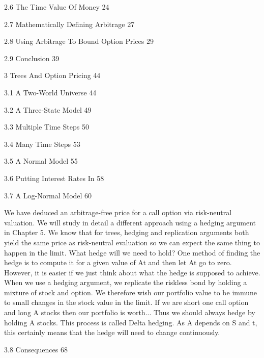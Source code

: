 2.6 The Time Value Of Money 24



2.7 Mathematically Defining Arbitrage 27



2.8 Using Arbitrage To Bound Option Prices 29



2.9 Conclusion 39



3 Trees And Option Pricing 44



3.1 A Two-World Universe 44



3.2 A Three-State Model 49



3.3 Multiple Time Steps 50



3.4 Many Time Steps 53



3.5 A Normal Model 55



3.6 Putting Interest Rates In 58



3.7 A Log-Normal Model 60

We have deduced an arbitrage-free price for a call option via risk-neutral valuation. We will study in detail a different approach using a hedging argument in Chapter 5. We know that for trees, hedging and replication arguments both yield the same price as risk-neutral evaluation so we can expect the same thing to happen in the limit. What hedge will we need to hold? One method of finding the hedge is to compute it for a given value of At and then let At go to zero. However, it is easier if we just think about what the hedge is supposed to achieve. When we use a hedging argument, we replicate the riskless bond by holding a mixture of stock and option. We therefore wish our portfolio value to be immune to small changes in the stock value in the limit. If we are short one call option and long A stocks then our portfolio is worth... Thus we should always hedge by holding A stocks. This process is called Delta hedging. As A depends on S and t, this certainly means that the hedge will need to change continuously.

3.8 Consequences 68

